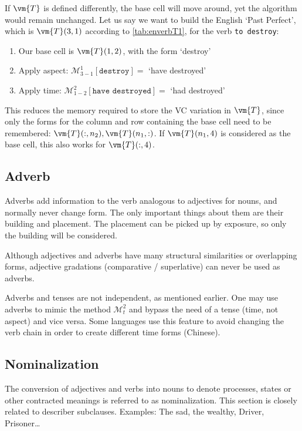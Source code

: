 If $\vm{T}$ is defined differently, the base cell will move around, yet the algorithm would remain unchanged.  Let us say we want to build  the English `Past Perfect', which is $\vm{T}(3,1)$ according to \autoref{tab:enverbT1}, for the verb \texttt{to destroy}:
\begin{example}
    \begin{enumerate}
    \item Our base cell is $\vm{T}(1,2)$, with the form `destroy' 
    \item Apply  aspect: $\mathcal{M}^{1}_{3-1}[\texttt{destroy}]=$ `have destroyed'
    \item Apply time: $\mathcal{M}^{2}_{1-2}[\texttt{have destroyed}]=$ `had destroyed'
    \end{enumerate}
\end{example}
This reduces the memory required to store the VC variation in $\vm{T}$, since only the  forms for the column and row  containing  the base cell need to be remembered: $\vm{T}(:,n_2), \vm{T}(n_1,:)$. If  $\vm{T}(n_1,4)$ is considered as the base cell, this also works for $\vm{T}(:,4)$.
\subsection{Adverb}
Adverbs add information to the verb analogous to adjectives for nouns, and normally never change form. The only important things about them are their building and placement. The placement can be picked up by exposure, so only the building will be considered. 

Although adjectives and adverbs have many structural similarities or overlapping forms,  adjective gradations (comparative / superlative) can never be used as adverbs. 

Adverbs and tenses are not independent, as mentioned earlier. One may use adverbs to mimic the method $\mathcal{M}^{2}_{t}$ and bypass the need of a tense (time, not aspect) and vice versa. Some languages use this feature to avoid changing the verb chain in order to create different  time forms (Chinese).
\subsection{Nominalization}
The conversion of adjectives and verbs into nouns to denote processes, states or other contracted meanings is referred to as nominalization. This section is closely related to describer subclauses. Examples: The sad, the wealthy, Driver, Prisoner\ldots

